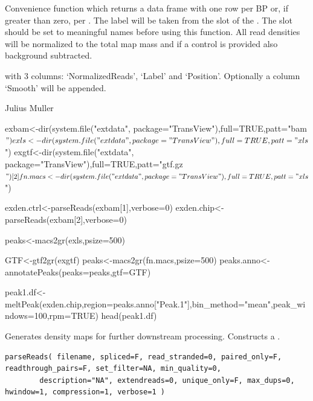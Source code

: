 \documentclass[letterpaper]{book}
\begin{document}
%
\begin{Details}
Convenience function which returns a data frame with one row per BP or, if  greater than zero, per . The label will be taken from the  slot of the . The slot should be set to meaningful names before using this function. All read densities will be normalized to the total map mass and if a control is provided also background subtracted.
\end{Details}
%
\begin{Value}
 with 3 columns: `NormalizedReads', `Label' and `Position'. Optionally a column `Smooth' will be appended.
\end{Value}
%
\begin{Author}
Julius Muller 
\end{Author}
%
\begin{Examples}
\begin{ExampleCode}

exbam<-dir(system.file("extdata", package="TransView"),full=TRUE,patt="bam$")
exls<-dir(system.file("extdata", package="TransView"),full=TRUE,patt="xls$")
exgtf<-dir(system.file("extdata", package="TransView"),full=TRUE,patt="gtf.gz$")[2]
fn.macs<-dir(system.file("extdata", package="TransView"),full=TRUE,patt="xls$")

exden.ctrl<-parseReads(exbam[1],verbose=0)
exden.chip<-parseReads(exbam[2],verbose=0)

peaks<-macs2gr(exls,psize=500)

GTF<-gtf2gr(exgtf)
peaks<-macs2gr(fn.macs,psize=500)
peaks.anno<-annotatePeaks(peaks=peaks,gtf=GTF)

peak1.df<-meltPeak(exden.chip,region=peaks.anno["Peak.1"],bin_method="mean",peak_windows=100,rpm=TRUE)
head(peak1.df)

\end{ExampleCode}
\end{Examples}
%
\begin{Description}

Generates density maps for further downstream processing. Constructs a .

\end{Description}
%
\begin{Usage}
\begin{verbatim}
parseReads( filename, spliced=F, read_stranded=0, paired_only=F, readthrough_pairs=F, set_filter=NA, min_quality=0,
		description="NA", extendreads=0, unique_only=F,	max_dups=0, hwindow=1, compression=1, verbose=1 )
\end{verbatim}
\end{Usage}
\end{document}
